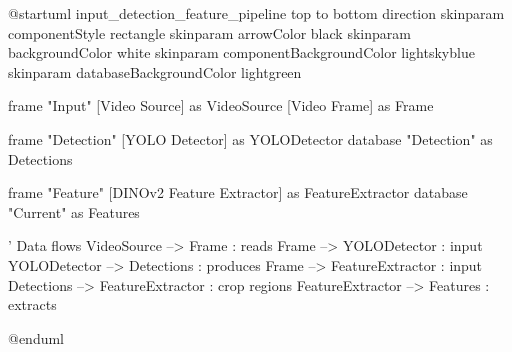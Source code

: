 \documentclass{scrartcl}
\begin{document}
\begin{plantuml}
@startuml input_detection_feature_pipeline
top to bottom direction
skinparam componentStyle rectangle
skinparam arrowColor black
skinparam backgroundColor white
skinparam componentBackgroundColor lightskyblue
skinparam databaseBackgroundColor lightgreen

frame "Input" {
  [Video Source] as VideoSource
  [Video Frame] as Frame
}

frame "Detection" {
  [YOLO Detector] as YOLODetector
  database "Detection\nResults" as Detections
}

frame "Feature\nExtraction" {
  [DINOv2 Feature Extractor] as FeatureExtractor
  database "Current\nFrame\nFeatures" as Features
}

' Data flows
VideoSource --> Frame : reads
Frame --> YOLODetector : input
YOLODetector --> Detections : produces
Frame --> FeatureExtractor : input
Detections --> FeatureExtractor : crop regions
FeatureExtractor --> Features : extracts

@enduml

\end{plantuml}
\end{document}
